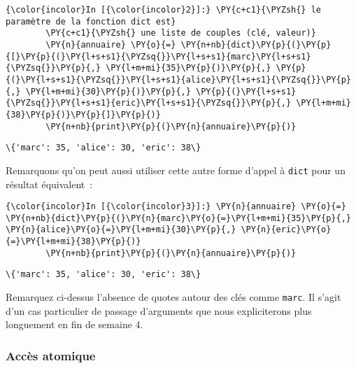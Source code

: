     \begin{Verbatim}[commandchars=\\\{\}]
{\color{incolor}In [{\color{incolor}2}]:} \PY{c+c1}{\PYZsh{} le paramètre de la fonction dict est}
        \PY{c+c1}{\PYZsh{} une liste de couples (clé, valeur)}
        \PY{n}{annuaire} \PY{o}{=} \PY{n+nb}{dict}\PY{p}{(}\PY{p}{[}\PY{p}{(}\PY{l+s+s1}{\PYZsq{}}\PY{l+s+s1}{marc}\PY{l+s+s1}{\PYZsq{}}\PY{p}{,} \PY{l+m+mi}{35}\PY{p}{)}\PY{p}{,} \PY{p}{(}\PY{l+s+s1}{\PYZsq{}}\PY{l+s+s1}{alice}\PY{l+s+s1}{\PYZsq{}}\PY{p}{,} \PY{l+m+mi}{30}\PY{p}{)}\PY{p}{,} \PY{p}{(}\PY{l+s+s1}{\PYZsq{}}\PY{l+s+s1}{eric}\PY{l+s+s1}{\PYZsq{}}\PY{p}{,} \PY{l+m+mi}{38}\PY{p}{)}\PY{p}{]}\PY{p}{)}
        \PY{n+nb}{print}\PY{p}{(}\PY{n}{annuaire}\PY{p}{)}
\end{Verbatim}


    \begin{Verbatim}[commandchars=\\\{\}]
\{'marc': 35, 'alice': 30, 'eric': 38\}

    \end{Verbatim}

    Remarquons qu'on peut aussi utiliser cette autre forme d'appel à
\texttt{dict} pour un résultat équivalent~:

    \begin{Verbatim}[commandchars=\\\{\}]
{\color{incolor}In [{\color{incolor}3}]:} \PY{n}{annuaire} \PY{o}{=} \PY{n+nb}{dict}\PY{p}{(}\PY{n}{marc}\PY{o}{=}\PY{l+m+mi}{35}\PY{p}{,} \PY{n}{alice}\PY{o}{=}\PY{l+m+mi}{30}\PY{p}{,} \PY{n}{eric}\PY{o}{=}\PY{l+m+mi}{38}\PY{p}{)}
        \PY{n+nb}{print}\PY{p}{(}\PY{n}{annuaire}\PY{p}{)}
\end{Verbatim}


    \begin{Verbatim}[commandchars=\\\{\}]
\{'marc': 35, 'alice': 30, 'eric': 38\}

    \end{Verbatim}

    Remarquez ci-dessus l'absence de quotes autour des clés comme
\texttt{marc}. Il s'agit d'un cas particulier de passage d'arguments que
nous expliciterons plus longuement en fin de semaine 4.

    \hypertarget{accuxe8s-atomique}{%
\subsubsection{Accès atomique}\label{accuxe8s-atomique}}

